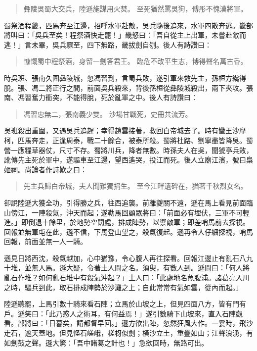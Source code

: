 \begin{quote}
彝陵吳蜀大交兵，陸遜施謀用火焚。
至死猶然罵吳狗，傅彤不愧漢將軍。
\end{quote}

蜀祭酒程畿，匹馬奔至江邊，招呼水軍赴敵，吳兵隨後追來，水軍四散奔逃。畿部將叫曰：「吳兵至矣！程祭酒快走罷！」畿怒曰：「吾自從主上出軍，未嘗赴敵而逃！」言未畢，吳兵驟至，四下無路，畿拔劍自刎。後人有詩讚曰：

\begin{quote}
慷慨蜀中程祭酒，身留一劍答君王。
臨危不改平生志，博得聲名萬古香。
\end{quote}

時吳班、張南久圍彝陵城，忽馮習到，言蜀兵敗，遂引軍來救先主，孫桓方纔得脫。張、馮二將正行之間，前面吳兵殺來，背後孫桓從彝陵城殺出，兩下夾攻。張南、馮習奮力衝突，不能得脫，死於亂軍之中。後人有詩讚曰：

\begin{quote}
馮習忠無二，張南義少雙。
沙場甘戰死，史冊共流芳。
\end{quote}

吳班殺出重圍，又遇吳兵追趕；幸得趙雲接著，救回白帝城去了。時有蠻王沙摩柯，匹馬奔走，正逢周泰，戰二十餘合，被泰所殺。蜀將杜路、劉寧盡皆降吳。蜀營一應糧草器仗，尺寸不存。蜀將川兵，降者無數。時孫夫人在吳，聞猇亭兵敗，訛傳先主死於軍中，遂驅車至江邊，望西遙哭，投江而死。後人立廟江濱，號曰梟姬祠。尚論者作詩歎之曰：

\begin{quote}
先主兵歸白帝城，夫人聞難獨捐生。
至今江畔遺碑在，猶著千秋烈女名。
\end{quote}

卻說陸遜大獲全功，引得勝之兵，往西追襲。前離夔關不遠，遜在馬上看見前面臨山傍江，一陣殺氣，沖天而起；遂勒馬回顧眾將曰：「前面必有埋伏，三軍不可輕進。」即倒退十餘里，於地勢空闊處，排成陣勢，以禦敵軍；即差哨馬前去探視。回報並無軍屯在此，遜不信，下馬登山望之，殺氣復起。遜再令人仔細探視，哨馬回報，前面並無一人一騎。

遜見日將西沈，殺氣越加，心中猶豫，令心腹人再往探看。回報江邊止有亂石八九十堆，並無人馬。遜大疑，令著土人問之名。須臾，有數人到。遜問曰：「何人將亂石作堆？如何亂石堆中有殺氣沖起？」土人曰：「此處地名魚腹浦。諸葛亮入川之時，驅兵到此，取石排成陣勢於沙灘之上；自此常常有氣如雲，從內而起。」

陸遜聽罷，上馬引數十騎來看石陣；立馬於山坡之上，但見四面八方，皆有門有戶。遜笑曰：「此乃惑人之術耳，有何益焉！」遂引數騎下山坡來，直入石陣觀看。部將曰：「日暮矣，請都督早回。」遜方欲出陣，忽然狂風大作。一霎時，飛沙走石，遮天蓋地。但見怪石嵯峨，槎枒似劍；橫沙立土，重疊如山；江聲浪湧，有如劍鼓之聲。遜大驚：「吾中諸葛之計也！」急欲回時，無路可出。

